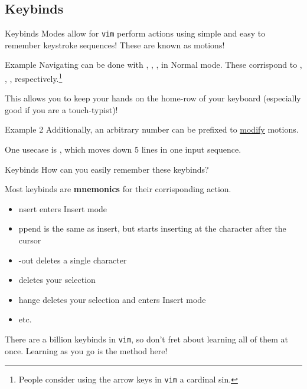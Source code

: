\documentclass{beamer}
\begin{document}
\subsection{Keybinds}
\begin{frame}{Keybinds}
	Modes allow for \texttt{vim} perform actions using simple and easy to
	remember keystroke sequences! \pause These are known as motions!
	\pause

	\begin{exampleblock}{Example}
		Navigating can be done with , , ,
		 in Normal mode. These corrispond to \keys{\arrowkeyleft},
		\keys{\arrowkeydown}, \keys{\arrowkeyup}, \keys{\arrowkeyright}
		respectively.\footnote{People consider using the arrow keys in
		\texttt{vim} a cardinal sin.}
		\pause

		This allows you to keep your hands on the home-row of your
		keyboard (especially good if you are a touch-typist)!
	\end{exampleblock}
	\pause

	\begin{exampleblock}{Example 2}
		Additionally, an arbitrary number can be prefixed to
		\underline{modify} motions.
		\pause

		One usecase is , which moves down 5 lines in one
		input sequence.
	\end{exampleblock}
\end{frame}

\begin{frame}{Keybinds}
	How can you easily remember these keybinds?
	\pause

	Most keybinds are \textbf{mnemonics} for their corrisponding action.
	\begin{itemize}
		\item {}nsert enters Insert mode
		\item {}ppend is the same as insert, but starts
			inserting at the character after the cursor
		\item {}-out deletes a single character
		\item {} deletes your selection
		\item {}hange deletes your selection and enters Insert
			mode
		\item etc.
	\end{itemize}
	\pause

	There are a billion keybinds in \texttt{vim}, so don't fret about
	learning all of them at once. Learning as you go is the method here!
\end{frame}
\end{document}
